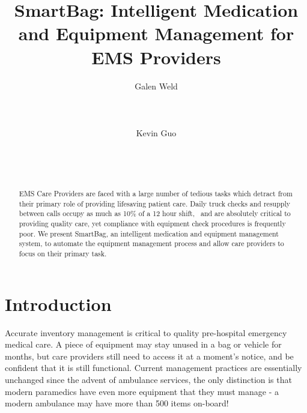 \documentclass{sigchi}
\begin{document}
\title{SmartBag: Intelligent Medication and Equipment Management for EMS
	Providers}

\author{
  \alignauthor Galen Weld\\
    \\
    \\
    \\
  \alignauthor Kevin Guo\\
    \\
    \\
    \\
}

\maketitle

\begin{abstract} \label{abstract}

EMS Care Providers are faced with a large number of tedious tasks which
detract from their primary role of providing lifesaving patient care.
Daily truck checks and resupply between calls occupy as much as 10\% of
a 12 hour shift,~\cite{checks} and are absolutely critical to providing
quality care, yet compliance with equipment check procedures is frequently
poor. We present SmartBag, an intelligent medication and equipment management
system, to automate the equipment management process and allow care
providers to focus on their primary task.

\end{abstract}



\section{Introduction} \label{intro}
Accurate inventory management is critical to quality pre-hospital emergency
medical care. A piece of equipment may stay unused in a bag or vehicle for
months, but care providers still need to access it at a moment’s notice,
and be confident that it is still functional. Current management practices
are essentially unchanged since the advent of ambulance services, the only
distinction is that modern paramedics have even more equipment that they
must manage - a modern ambulance may have more than 500 items on-board! ~\cite{rfid}
\end{document}
